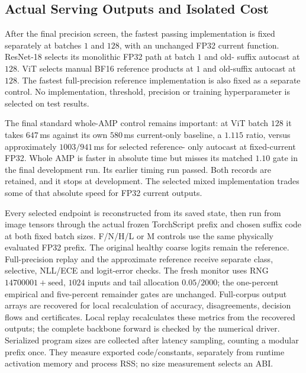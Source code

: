 \subsection{Actual Serving Outputs and Isolated Cost}\label{app:served_frontier}

After the final precision screen, the fastest passing implementation is
fixed separately at batches $1$ and $128$, with an unchanged FP32 current
function. ResNet-18 selects its monolithic FP32 path at batch $1$ and old-
suffix autocast at $128$. ViT selects manual BF16 reference products at
$1$ and old-suffix autocast at $128$. The fastest full-precision reference
implementation is also fixed as a separate control. No implementation,
threshold, precision or training hyperparameter is selected on test results.

The final standard whole-AMP control remains important: at ViT batch $128$
it takes $647$\,ms against its own $580$\,ms current-only baseline, a
$1.115$ ratio, versus approximately $1003/941$\,ms for selected reference-
only autocast at fixed-current FP32. Whole AMP is faster in absolute time
but misses its matched $1.10$ gate in the final development run. Its earlier
timing run passed. Both records are retained, and it stops at development.
The selected mixed implementation trades some of that absolute speed
for FP32 current outputs.

Every selected endpoint is reconstructed from its saved state, then run
from image tensors through the actual frozen TorchScript prefix and chosen
suffix code at both fixed batch sizes. F/N/H/L or M controls use the
same physically evaluated FP32 prefix. The original healthy coarse logits
remain the reference. Full-precision replay and the approximate reference
receive separate class, selective, NLL/ECE and logit-error checks. The fresh
monitor uses RNG $14700001+\mathrm{seed}$, $1024$ inputs and tail allocation
$0.05/2000$; the one-percent empirical and five-percent remainder gates are
unchanged. Full-corpus output arrays are recovered for local recalculation
of accuracy, disagreements, decision flows and certificates. Local replay recalculates these metrics from the recovered outputs;
the complete backbone forward is checked by the numerical driver.
Serialized program sizes are collected after latency sampling, counting a
modular prefix once. They measure exported code/constants, separately from
runtime activation memory and process RSS; no size measurement selects an ABI.




